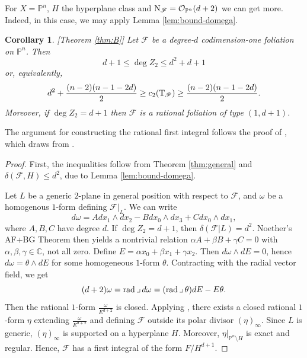 \documentclass[a4paper, 11pt]{amsart}
\theoremstyle{plain}
\numberwithin{theorem}{section}
\newtheorem{corollary}[theorem]{Corollary}
\theoremstyle{definition}
\newcommand{\C}{\mathbb{C}}
\DeclareMathOperator{\cont}{\lrcorner}
\newcommand{\opn}{{\mathcal O}_{\mathbb{P}^{n}}}
\newcommand{\pn}{{\mathbb{P}^{n}}}
\newcommand{\sF}{\mathscr{F}}
\newcommand{\tF}{{\rm T}_\mathscr{F}}
\newcommand{\nF}{{\rm N}_\mathscr{F}}
\newcommand{\rad}{ {\rm rad}}
\begin{document}





For $X = \pn$, $H$ the hyperplane class and $\nF = \opn(d+2)$ we can get more. Indeed, in this case, we may apply Lemma \ref{lem:bound-domega}. 

\begin{corollary}\label{cor:boundPN}[Theorem \ref{thm:B}]
Let $\sF$ be a degree-$d$ codimension-one foliation on $\pn$. Then 
\[
 d+ 1 \leq \deg Z_2 \leq d^2+d+1
\]
or, equivalently, 
\[
d^2 + \frac{(n-2)(n-1-2d)}{2} \geq c_2(\tF) \geq \frac{(n-2)(n-1-2d)}{2}.
\]
Moreover, if $\deg Z_2 = d+1$ then $\sF$ is a rational foliation of type $(1,d+1)$.
\end{corollary}

The argument for constructing the rational first integral follows the proof of \cite[Proposi\c{c}\~ao 2.6]{FassarellaThesis}, which draws from \cite[Proposition 5.1]{LnP}. 

\begin{proof}
First, the inequalities follow from Theorem \ref{thm:general} and $\delta(\sF,H) \leq d^2$, due to Lemma \ref{lem:bound-domega}. 

Let $L$ be a generic $2$-plane in general position with respect to $\sF$, and $\omega$ be a homogenous $1$-form defining $\sF|_L$. We can write 
\[
     d\omega = Adx_1\wedge dx_2 - B dx_0\wedge dx_3 + Cdx_0 \wedge dx_1,
\]
where $A, B, C$ have degree $d$. If $\deg Z_2 = d+1$, then $\delta(\sF|L) = d^2$.
Noether's AF+BG Theorem then yields a nontrivial relation $\alpha A + \beta B + \gamma C = 0$ with $\alpha,\beta,\gamma \in \C$, not all zero. Define $E= \alpha x_0 + \beta x_1 + \gamma x_2$. Then $d\omega \wedge dE = 0$, hence $d\omega = \theta \wedge dE $ for some homogeneous $1$-form $\theta$. Contracting with the radial vector field, we get
\[
(d+2)\omega = \rad \cont d\omega = (\rad \cont \theta) dE - E\theta.
\]
Then the rational $1$-form $\frac{\omega}{E^{d+2}}$ is closed. Applying \cite[Lemma 9]{CLS}, there exists a closed rational $1$-form $\eta$ extending $\frac{\omega}{E^{d+2}}$ and defining $\sF$ outside its polar divisor $(\eta)_\infty$. Since $L$ is generic, $(\eta)_\infty$ is supported on a hyperplane $H$. Moreover, $\eta|_{\pn \setminus H}$ is exact and regular. Hence, $\sF$ has a first integral of the form $F/H^{d+1}$.     
\end{proof}



\end{document}
